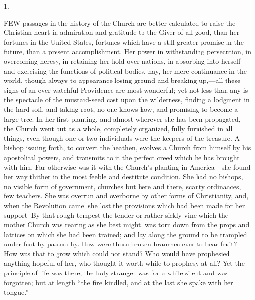 1.

FEW
passages in the history of the Church are better calculated to raise
the Christian heart in admiration and gratitude to the Giver of all
good, than her fortunes in the United States, fortunes which have a
still greater promise in the future, than a present accomplishment.
Her power in withstanding persecution, in overcoming heresy, in
retaining her hold over nations, in absorbing into herself and
exercising the functions of political bodies, nay, her mere
continuance in the world, though always to appearance losing ground
and breaking up,—all these signs of an ever-watchful Providence are
most wonderful; yet not less than any is the spectacle of the
mustard-seed cast upon the wilderness, finding a lodgment in the hard
soil, and taking root, no one knows how, and promising to become a
large tree. In her first planting, and almost wherever she has been
propagated, the Church went out as a whole, completely organized,
fully furnished in all things, even though one or two individuals were
the keepers of the treasure. A bishop issuing forth, to convert the
heathen, evolves a Church from himself by his apostolical powers, and
transmits to it the perfect creed which he has brought with him. Far
otherwise was it with the Church's planting in America—she
found her way thither in the most feeble and destitute condition. She
had no bishops, no visible form of government, churches but here and
there, scanty ordinances, few teachers. She was overrun and overborne
by other forms of Christianity, and, when the Revolution came, she
lost the provisions which had been made for her support. By that rough
tempest the tender or rather sickly vine which the mother Church was
rearing as she best might, was torn down from the props and lattices
on which she had been trained; and lay along the ground to be trampled
under foot by passers-by. How were those broken branches ever to bear
fruit? How was that to grow which could not stand? Who would have
prophesied anything hopeful of her, who thought it worth while to
prophesy at all? Yet the principle of life was there; the holy
stranger was for a while silent and was forgotten; but at length ``the
fire kindled, and at the last she spake with her tongue.''

